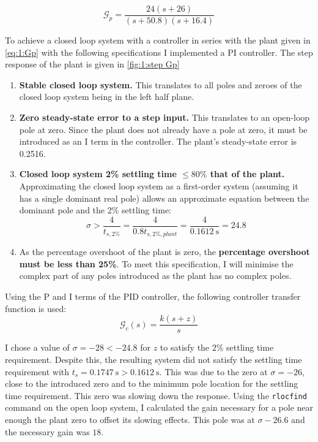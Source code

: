 \problem

\begin{equation}\label{eq:1:Gp}
	\mathcal{G}_p = \frac{24 (s + 26)}{(s+50.8)(s+16.4)}
\end{equation}

To achieve a closed loop system with a controller in series with the plant given in \cref{eq:1:Gp} with the following specifications I implemented a PI controller. The step response of the plant is given in \cref{fig:1:step Gp}
\begin{enumerate}
	\item \textbf{Stable closed loop system.} This translates to all poles and zeroes of the closed loop system being in the left half plane.
	\item \textbf{Zero steady-state error to a step input.} This translates to an open-loop pole at zero. Since the plant does not already have a pole at zero, it must be introduced as an I term in the controller. The plant's steady-state error is 0.2516.
	\item \textbf{Closed loop system 2\% settling time $\leq80\%$ that of the plant.} Approximating the closed loop system as a first-order system (assuming it has a single dominant real pole) allows an approximate equation between the dominant pole and the 2\% settling time:
	$$
	\sigma > \frac{4}{t_{s,2\%}} = \frac{4}{0.8 t_{s,2\%,plant}} = \frac{4}{\SI{0.1612}{\second}} = 24.8
	$$
	\item As the percentage overshoot of the plant is zero, the \textbf{percentage overshoot must be less than 25\%}. To meet this specification, I will minimise the complex part of any poles introduced as the plant has no complex poles.
\end{enumerate}


Using the P and I terms of the PID controller, the following controller transfer function is used:
\begin{equation}\label{eq:1:Gc}
	\mathcal{G}_c(s) = \frac{k(s+z)}{s}
\end{equation}

I chose a value of $\sigma = -28 < -24.8$ for $z$ to satisfy the 2\% settling time requirement. Despite this, the resulting system did not satisfy the settling time requirement with $t_s = \SI{0.1747}{\second}>\SI{0.1612}{\second}$. This was due to the zero at $\sigma = -26$, close to the introduced zero and to the minimum pole location for the settling time requirement. This zero was slowing down the response. Using the \texttt{rlocfind} command on the open loop system, I calculated the gain necessary for a pole near enough the plant zero to offset its slowing effects. This pole was at $\sigma  -26.6$ and the necessary gain was $18$.

